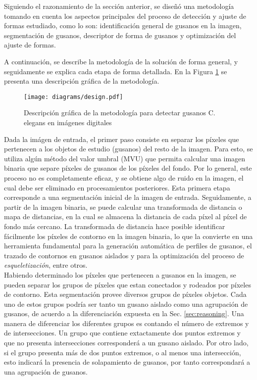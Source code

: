 Siguiendo el razonamiento de la secci\'on anterior, se dise\~n\'o una metodolog\'ia tomando en cuenta
los aspectos principales del proceso de detecci\'on y ajuste de formas estudiado, como lo son:
identificaci\'on general de gusanos en la imagen, segmentaci\'on de gusanos, 
descriptor de forma de gusanos y optimizaci\'on del ajuste de formas.

A continuaci\'on, se describe la metodolog\'ia de la soluci\'on de forma general,  y
seguidamente se explica cada etapa de forma detallada.
En la Figura \ref{fig:methsol} se presenta una descripci\'on gr\'afica de la metodolog\'ia.\\

\begin{figure}[h t b p ! H]
 \centering
   \texttt{[image: diagrams/design.pdf]}
 \caption{Descripci\'on gr\'afica de la metodolog\'ia para detectar gusanos C. elegans
   en im\'agenes digitales}
\label{fig:methsol}
\end{figure}

Dada la im\'agen de entrada, el primer paso consiste en separar los p\'ixeles que
pertenecen a los objetos de estudio (gusanos) del resto de la imagen. Para esto,
se utiliza alg\'un m\'etodo del valor umbral (MVU) que permita calcular una imagen
binaria que separe p\'ixeles de gusanos de los p\'ixeles del fondo. Por lo general,
este proceso no es completamente eficaz, y se obtiene algo de ruido en la imagen, el
cual debe ser eliminado en procesamientos posteriores. Esta primera etapa corresponde
a una segmentaci\'on inicial de la imagen de entrada.
Seguidamente, a partir de la imagen binaria, se puede calcular una transformada de
distancia o mapa de distancias, en la cual se almacena la distancia de cada p\'ixel
al p\'ixel de fondo m\'as cercano. La transformada de distancia hace posible identificar
f\'acilmente los p\'ixeles de contorno en la imagen binaria, lo que la convierte en
una herramienta fundamental para la generaci\'on autom\'atica de perfiles de gusanos,
el trazado de contornos en gusanos aislados y para la optimizaci\'on del proceso
de \emph{esqueletizaci\'on}, entre otros. \\

Habiendo determinado los p\'ixeles que pertenecen a gusanos en la imagen, se pueden separar
los grupos de p\'ixeles que estan conectados y rodeados por p\'ixeles de contorno. Esta
segmentaci\'on provee diversos grupos de p\'ixeles objetos. Cada uno de estos grupos
podr\'ia ser tanto un gusano aislado como una agrupaci\'on de gusanos, de acuerdo a la diferenciaci\'on
expuesta en la Sec. \ref{sec:reasoning}.
Una manera de diferenciar los diferentes grupos es contando el n\'umero de extremos y de intersecciones. 
Un grupo que contiene extactamente dos puntos extremos y que
no presenta intersecciones corresponder\'a a un gusano aislado. Por otro lado, si el grupo presenta
m\'as de dos puntos extremos, o al menos una intersecci\'on, esto indicar\'a la presencia de 
solapamiento de gusanos, por tanto correspondar\'a a una agrupaci\'on de gusanos.\\

